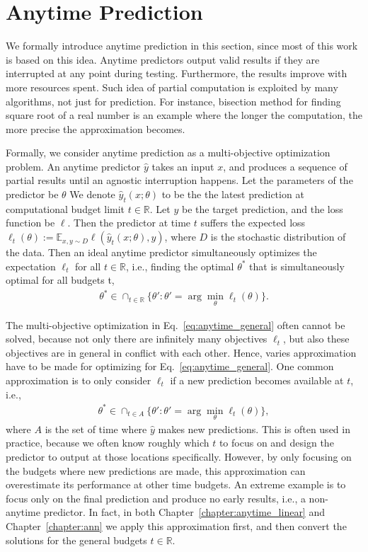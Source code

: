 \section{Anytime Prediction}

We formally introduce anytime prediction in this section, since most of this work is 
based on this idea. Anytime predictors output valid results if they are interrupted at any point during testing. 
Furthermore, the results improve with more resources spent.
Such idea of partial computation is exploited by many algorithms, not just for prediction. 
For instance, bisection method for finding square root of a real number is an example where the longer
the computation, the more precise the approximation becomes. 

Formally, we consider anytime prediction as a multi-objective optimization problem. 
An anytime predictor $\hat{y}$ takes an input $x$, and produces a sequence of partial results until an agnostic
interruption happens. Let the parameters of the predictor be $\theta$
We denote $\hat{y}_t(x; \theta)$ to be the the latest prediction at computational budget limit $t \in \mathbb{R}$.
Let $y$ be the target prediction, and the loss function be $\ell$. 
Then the predictor at time $t$ suffers the expected loss
$\ell_t(\theta) := \mathbb{E}_{x, y \sim D} \ell(\hat{y}_t(x ; \theta), y)$, where $D$ is the stochastic distribution of the data. 
Then an ideal anytime predictor simultaneously optimizes the expectation $\ell_t$ for all $t\in \mathbb{R}$, i.e., finding the 
optimal $\theta^*$ that is simultaneously optimal for all budgets t, 
\begin{align}
 \theta^* \in \cap _{t \in \mathbb{R}} \{ \theta' : \theta' = \arg \min _{\theta} \ell _t(\theta) \}.
 \label{eq:anytime_general}
\end{align}

The multi-objective optimization in Eq.~\ref{eq:anytime_general} often cannot be solved, 
because not only there are infinitely many objectives $\ell_t$, but also these objectives
are in general in conflict with each other.
Hence, varies approximation have to be made for optimizing for Eq.~\ref{eq:anytime_general}. 
One common approximation is to only consider $\ell_t$ if a new prediction becomes available at $t$, i.e., 
\begin{align}
 \theta^* \in \cap _{t \in A} \{ \theta' : \theta' = \arg \min _{\theta} \ell _t(\theta) \},
 \label{eq:anytime_general_discrete}
\end{align}
where $A$ is the set of time where $\hat{y}$ makes new predictions. 
This is often used in practice, because we often know roughly which $t$ to focus on and design the 
predictor to output at those locations specifically. 
However, by only focusing on the budgets where
new predictions are made, this approximation can overestimate its performance at other time budgets.
An extreme example is to focus only on the final prediction and produce no early results, i.e., 
a non-anytime predictor.
In fact, in both Chapter~\ref{chapter:anytime_linear} and Chapter~\ref{chapter:ann} we apply this 
approximation first, and then convert the solutions for the general budgets $t \in \mathbb{R}$. 

